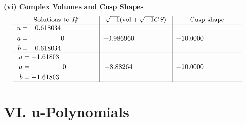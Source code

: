 \documentclass[1p]{elsarticle_modified}
\theoremstyle{definition}
\newcommand{\I}{\sqrt{-1}}
\begin{document}
\newpage\flushleft \textbf{(vi) Complex Volumes and Cusp Shapes}
$$\begin{array}{c|c|c}  
\text{Solutions to }I^u_{5}& \I (\text{vol} + \sqrt{-1}CS) & \text{Cusp shape}\\
 \hline 
\begin{aligned}
u &= \phantom{-}0.618034\phantom{ +0.000000I} \\
a &= \phantom{-0.000000 } 0 \\
b &= \phantom{-}0.618034\phantom{ +0.000000I}\end{aligned}
 & -0.986960\phantom{ +0.000000I} & -10.0000\phantom{ +0.000000I} \\ \hline\begin{aligned}
u &= -1.61803\phantom{ +0.000000I} \\
a &= \phantom{-0.000000 } 0 \\
b &= -1.61803\phantom{ +0.000000I}\end{aligned}
 & -8.88264\phantom{ +0.000000I} & -10.0000\phantom{ +0.000000I}\\
 \hline 
 \end{array}$$\newpage
\newpage\renewcommand{\arraystretch}{1}
\centering \section*{ VI. u-Polynomials}
\end{document}

